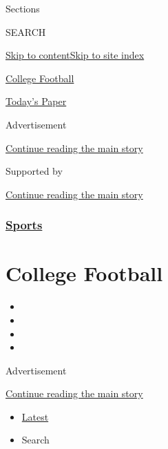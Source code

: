 Sections

SEARCH

\protect\hyperlink{site-content}{Skip to
content}\protect\hyperlink{site-index}{Skip to site index}

\href{https://www.nytimes3xbfgragh.onion/section/sports/ncaafootball}{College
Football}

\href{https://myaccount.nytimes3xbfgragh.onion/auth/login?response_type=cookie\&client_id=vi}{}

\href{https://www.nytimes3xbfgragh.onion/section/todayspaper}{Today's
Paper}

Advertisement

\protect\hyperlink{after-top}{Continue reading the main story}

Supported by

\protect\hyperlink{after-sponsor}{Continue reading the main story}

\hypertarget{sports}{%
\subsubsection{\texorpdfstring{\href{/section/sports}{Sports}}{Sports}}\label{sports}}

\hypertarget{college-football}{%
\section{College Football}\label{college-football}}

\begin{itemize}
\item
\item
\item
\item
\end{itemize}

Advertisement

\protect\hyperlink{after-subheader}{Continue reading the main story}

\begin{itemize}
\tightlist
\item
  \protect\hyperlink{stream-panel}{Latest}
\item
  Search
\end{itemize}

